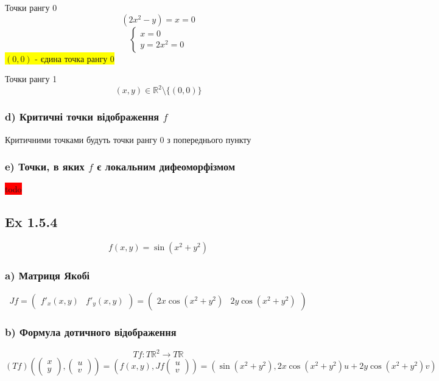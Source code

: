 \documentclass[10pt, a4paper]{article} %
\newcommand{\R}{\mathbb{R}}
\newcommand{\J}{J}
\newcommand{\todo}[1]{\colorbox{red}{#1}}
\begin{document}
Точки рангу 0
\[(2x^2-y)=x=0\]
\[\begin{cases}
    x = 0\\
    y = 2x^2 = 0
\end{cases}\]
\colorbox{yellow}{$(0,0)$ - єдина точка рангу 0}

Точки рангу 1
\[(x,y) \in \R^2 \setminus \{(0,0)\}\]

\subsubsection*{d) Критичні точки відображення $f$}

Критичними точками будуть точки рангу 0 з попереднього пункту

\subsubsection*{e) Точки, в яких $f$ є локальним дифеоморфізмом}
\todo{todo}


\subsection*{Ex 1.5.4}
\begin{mdframed}
    \[f(x,y) = \sin(x^2+y^2)\]
\end{mdframed}

\subsubsection*{a) Матриця Якобі}
\[\J f = \begin{pmatrix}
    f'_x(x,y) & f'_y(x,y)
\end{pmatrix} = \begin{pmatrix}
    2x\cos(x^2+y^2) & 2y\cos(x^2+y^2)
\end{pmatrix}\]

\subsubsection*{b) Формула дотичного відображення}
\[Tf : T\R^2 \to T\R\]
\[(Tf)\left(\begin{pmatrix} x \\ y \end{pmatrix}, \begin{pmatrix} u \\ v \end{pmatrix}\right) 
= \left(f(x,y),\J f \begin{pmatrix} u \\ v \end{pmatrix}\right) 
= \left(\sin(x^2+y^2), 2x\cos(x^2+y^2)u + 2y\cos(x^2+y^2)v\right)\]
\end{document}
